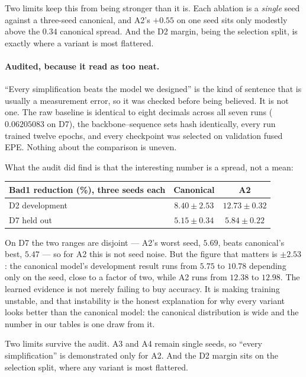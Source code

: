 \documentclass[11pt,a4paper]{article}
\begin{document}
Two limits keep this from being stronger than it is. Each ablation is a
\emph{single} seed against a three-seed canonical, and A2's $+0.55$ on one
seed sits only modestly above the $0.34$ canonical spread. And the D2
margin, being the selection split, is exactly where a variant is most
flattered.

\paragraph{Audited, because it read as too neat.} ``Every simplification
beats the model we designed'' is the kind of sentence that is usually a
measurement error, so it was checked before being believed. It is not one.
The raw baseline is identical to eight decimals across all seven runs
($0.06205083$ on D7), the backbone--sequence sets hash identically, every
run trained twelve epochs, and every checkpoint was selected on validation
fused EPE. Nothing about the comparison is uneven.

What the audit did find is that the interesting number is a spread, not a
mean:

\begin{center}
\begin{tabular}{lcc}
\toprule
Bad1 reduction (\%), three seeds each & Canonical & A2 \\
\midrule
D2 development & $8.40 \pm 2.53$ & $12.73 \pm 0.32$ \\
D7 held out    & $5.15 \pm 0.34$ & $5.84 \pm 0.22$ \\
\bottomrule
\end{tabular}
\end{center}

On D7 the two ranges are disjoint --- A2's worst seed, $5.69$, beats
canonical's best, $5.47$ --- so for A2 this is not seed noise. But the
figure that matters is $\pm 2.53$: the canonical model's development
result runs from $5.75$ to $10.78$ depending only on the seed, close to a
factor of two, while A2 runs from $12.38$ to $12.98$. The learned evidence
is not merely failing to buy accuracy. It is making training unstable, and
that instability is the honest explanation for why every variant looks
better than the canonical model: the canonical distribution is wide and
the number in our tables is one draw from it.

Two limits survive the audit. A3 and A4 remain single seeds, so ``every
simplification'' is demonstrated only for A2. And the D2 margin sits on
the selection split, where any variant is most flattered.
\end{document}
